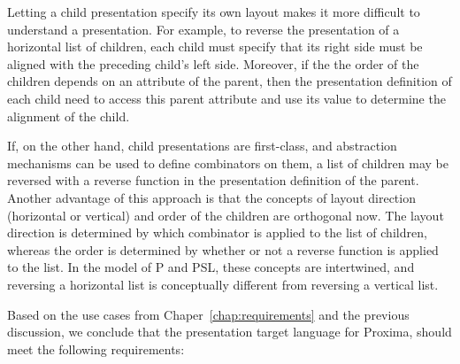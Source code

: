 Letting a child presentation specify its own layout makes it more difficult to understand a presentation. For example, to reverse the presentation of a horizontal list of children, each child must specify that its right side must be aligned with the preceding child's left side. Moreover, if the the order of the children depends on an attribute of the parent, then the presentation definition of each child need to access this parent attribute and use its value to determine the alignment of the child.

If, on the other hand, child presentations are first-class, and abstraction mechanisms can be used to define combinators on them, a list of children may be reversed with a reverse function in the presentation definition of the parent.  Another advantage of this approach is that the concepts of layout direction (horizontal or vertical) and order of the children are orthogonal now. The layout direction is determined by which combinator is applied to the list of children, whereas the order is determined by whether or not a reverse function is applied to the list. In the model of P and PSL, these concepts are intertwined, and reversing a horizontal list is conceptually different from reversing a vertical list.


Based on the use cases from Chaper~\ref{chap:requirements} and the previous discussion, we conclude that the presentation target language for Proxima, should meet the following requirements: 

